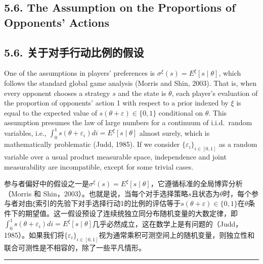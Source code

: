 \documentclass[12pt,a4paper]{article}
\newenvironment{original}
  {\par\medskip\noindent\color{black}\ignorespaces}
  {\par\medskip}
\newenvironment{translation}
  {\par\noindent\color{darkblue}\ignorespaces}
  {\par\medskip\noindent\hrule\par\medskip}
\theoremstyle{definition}
\theoremstyle{remark}
\begin{document}
\subsection{5.6. The Assumption on the Proportions of Opponents' Actions}
\subsection*{\color{darkblue}5.6. 关于对手行动比例的假设}

\begin{original}
One of the assumptions in players' preferences is $\sigma^\xi(s) = E^\xi[s \mid \theta]$, which follows the standard global game analysis (Morris and Shin, 2003). That is, when every opponent chooses a strategy $s$ and the state is $\theta$, each player's evaluation of the proportion of opponents' action 1 with respect to a prior indexed by $\xi$ is equal to the expected value of $s(\theta + \varepsilon) \in \{0, 1\}$ conditional on $\theta$. This assumption presumes the law of large numbers for a continuum of i.i.d.\ random variables, i.e., $\int_0^1 s(\theta + \varepsilon_i) di = E^\xi[s \mid \theta]$ almost surely, which is mathematically problematic (Judd, 1985). If we consider $\{\varepsilon_i\}_{i \in [0,1]}$ as a random variable over a usual product measurable space, independence and joint measurability are incompatible, except for some trivial cases.
\end{original}
\begin{translation}
参与者偏好中的假设之一是$\sigma^\xi(s) = E^\xi[s \mid \theta]$，它遵循标准的全局博弈分析（Morris 和 Shin，2003）。也就是说，当每个对手选择策略$s$且状态为$\theta$时，每个参与者对由$\xi$索引的先验下对手选择行动1的比例的评估等于$s(\theta + \varepsilon) \in \{0, 1\}$在$\theta$条件下的期望值。这一假设预设了连续统独立同分布随机变量的大数定律，即$\int_0^1 s(\theta + \varepsilon_i) di = E^\xi[s \mid \theta]$几乎必然成立，这在数学上是有问题的（Judd，1985）。如果我们将$\{\varepsilon_i\}_{i \in [0,1]}$视为通常乘积可测空间上的随机变量，则独立性和联合可测性是不相容的，除了一些平凡情形。
\end{translation}
\end{document}
